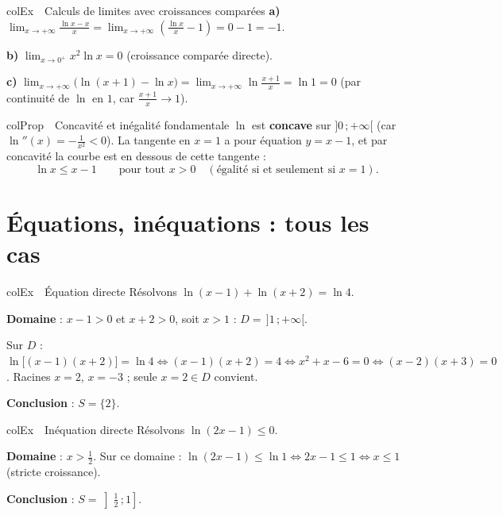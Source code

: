 \documentclass[11pt,a4paper]{article}
\newenvironment{propriete}[1][Propriété]
  {\begin{fiche}{colProp}{\ding{72}~~#1}}{\end{fiche}}
\newenvironment{exemple}[1][Exemple]
  {\begin{fiche}{colEx}{\ding{217}~~#1}}{\end{fiche}}
\begin{document}
\begin{exemple}[Calculs de limites avec croissances comparées]
\textbf{a)} $\displaystyle\lim_{x \to +\infty} \frac{\ln x - x}{x} = \lim_{x\to+\infty}\left(\frac{\ln x}{x} - 1\right) = 0 - 1 = -1$.

\smallskip
\textbf{b)} $\displaystyle\lim_{x \to 0^+} x^2 \ln x = 0$ (croissance comparée directe).

\smallskip
\textbf{c)} $\displaystyle\lim_{x \to +\infty} \bigl(\ln(x+1) - \ln x\bigr) = \lim_{x\to+\infty}\ln\frac{x+1}{x} = \ln 1 = 0$ (par continuité de $\ln$ en $1$, car $\frac{x+1}{x}\to 1$).
\end{exemple}

\begin{propriete}[Concavité et inégalité fondamentale]
$\ln$ est \textbf{concave} sur $]0\,;+\infty[$ (car $\ln''(x) = -\frac{1}{x^2} < 0$). La tangente en $x=1$ a pour équation $y = x - 1$, et par concavité la courbe est en dessous de cette tangente :
\[
  \ln x \leq x - 1 \qquad \text{pour tout } x > 0 \quad (\text{égalité si et seulement si } x = 1).
\]
\end{propriete}

\section{Équations, inéquations : tous les cas}

\begin{exemple}[Équation directe]
Résolvons $\ln(x-1) + \ln(x+2) = \ln 4$.

\smallskip
\textbf{Domaine} : $x-1>0$ et $x+2>0$, soit $x>1$ : $D=\,]1\,;+\infty[$.

\smallskip
Sur $D$ : $\ln\bigl[(x-1)(x+2)\bigr]=\ln4 \iff (x-1)(x+2)=4 \iff x^2+x-6=0 \iff (x-2)(x+3)=0$. Racines $x=2$, $x=-3$ ; seule $x=2\in D$ convient.

\smallskip
\textbf{Conclusion} : $S=\{2\}$.
\end{exemple}

\begin{exemple}[Inéquation directe]
Résolvons $\ln(2x-1)\leq 0$.

\smallskip
\textbf{Domaine} : $x>\frac12$. Sur ce domaine : $\ln(2x-1)\leq \ln1 \iff 2x-1\leq1 \iff x\leq1$ (stricte croissance).

\smallskip
\textbf{Conclusion} : $S=\left]\frac12\,;1\right]$.
\end{exemple}
\end{document}
